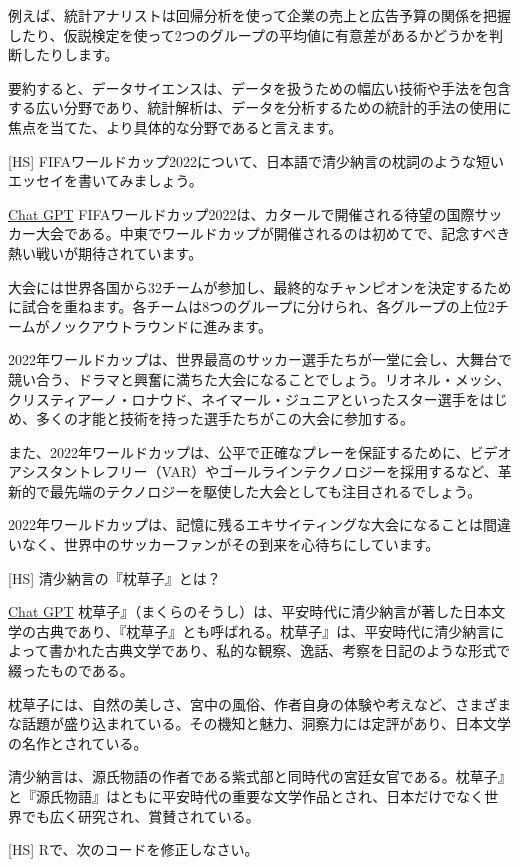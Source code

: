 \documentclass[
]{book}
\theoremstyle{definition}
\theoremstyle{definition}
\theoremstyle{definition}
\theoremstyle{definition}
\theoremstyle{remark}
\begin{document}
例えば、統計アナリストは回帰分析を使って企業の売上と広告予算の関係を把握したり、仮説検定を使って2つのグループの平均値に有意差があるかどうかを判断したりします。

要約すると、データサイエンスは、データを扱うための幅広い技術や手法を包含する広い分野であり、統計解析は、データを分析するための統計的手法の使用に焦点を当てた、より具体的な分野であると言えます。

{[}HS{]} FIFAワールドカップ2022について、日本語で清少納言の枕詞のような短いエッセイを書いてみましょう。

\protect\hyperlink{chatgpt}{Chat GPT} FIFAワールドカップ2022は、カタールで開催される待望の国際サッカー大会である。中東でワールドカップが開催されるのは初めてで、記念すべき熱い戦いが期待されています。

大会には世界各国から32チームが参加し、最終的なチャンピオンを決定するために試合を重ねます。各チームは8つのグループに分けられ、各グループの上位2チームがノックアウトラウンドに進みます。

2022年ワールドカップは、世界最高のサッカー選手たちが一堂に会し、大舞台で競い合う、ドラマと興奮に満ちた大会になることでしょう。リオネル・メッシ、クリスティアーノ・ロナウド、ネイマール・ジュニアといったスター選手をはじめ、多くの才能と技術を持った選手たちがこの大会に参加する。

また、2022年ワールドカップは、公平で正確なプレーを保証するために、ビデオアシスタントレフリー（VAR）やゴールラインテクノロジーを採用するなど、革新的で最先端のテクノロジーを駆使した大会としても注目されるでしょう。

2022年ワールドカップは、記憶に残るエキサイティングな大会になることは間違いなく、世界中のサッカーファンがその到来を心待ちにしています。

{[}HS{]} 清少納言の『枕草子』とは？

\protect\hyperlink{chatgpt}{Chat GPT} 枕草子』（まくらのそうし）は、平安時代に清少納言が著した日本文学の古典であり、『枕草子』とも呼ばれる。枕草子』は、平安時代に清少納言によって書かれた古典文学であり、私的な観察、逸話、考察を日記のような形式で綴ったものである。

枕草子には、自然の美しさ、宮中の風俗、作者自身の体験や考えなど、さまざまな話題が盛り込まれている。その機知と魅力、洞察力には定評があり、日本文学の名作とされている。

清少納言は、源氏物語の作者である紫式部と同時代の宮廷女官である。枕草子』と『源氏物語』はともに平安時代の重要な文学作品とされ、日本だけでなく世界でも広く研究され、賞賛されている。

{[}HS{]} Rで、次のコードを修正しなさい。
\end{document}
